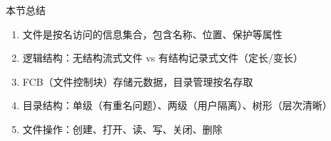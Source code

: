 \documentclass[10pt, aspectratio=169]{beamer}
\begin{document}
\begin{frame}{本节总结}
    \begin{enumerate}
        \item 文件是按名访问的信息集合，包含名称、位置、保护等属性
        \item 逻辑结构：无结构流式文件 vs 有结构记录式文件（定长/变长）
        \item FCB（文件控制块）存储元数据，目录管理按名存取
        \item 目录结构：单级（有重名问题）、两级（用户隔离）、树形（层次清晰）
        \item 文件操作：创建、打开、读、写、关闭、删除
    \end{enumerate}
\end{frame}
\end{document}
